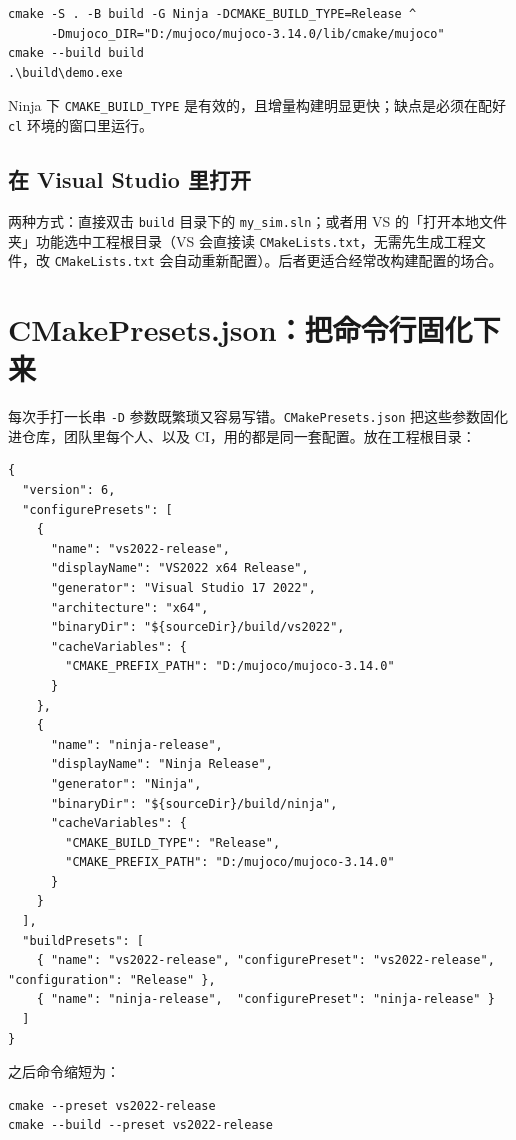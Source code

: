 \begin{lstlisting}[style=shell]
cmake -S . -B build -G Ninja -DCMAKE_BUILD_TYPE=Release ^
      -Dmujoco_DIR="D:/mujoco/mujoco-3.14.0/lib/cmake/mujoco"
cmake --build build
.\build\demo.exe
\end{lstlisting}

Ninja 下 \texttt{CMAKE\_BUILD\_TYPE} 是有效的，且增量构建明显更快；缺点是必须在配好 \texttt{cl} 环境的窗口里运行。

\subsection{在 Visual Studio 里打开}

两种方式：直接双击 \texttt{build} 目录下的 \texttt{my\_sim.sln}；或者用 VS 的「打开本地文件夹」功能选中工程根目录（VS 会直接读 \texttt{CMakeLists.txt}，无需先生成工程文件，改 \texttt{CMakeLists.txt} 会自动重新配置）。后者更适合经常改构建配置的场合。

\section{CMakePresets.json：把命令行固化下来}

每次手打一长串 \texttt{-D} 参数既繁琐又容易写错。\texttt{CMakePresets.json} 把这些参数固化进仓库，团队里每个人、以及 CI，用的都是同一套配置。放在工程根目录：

\begin{lstlisting}[style=code]
{
  "version": 6,
  "configurePresets": [
    {
      "name": "vs2022-release",
      "displayName": "VS2022 x64 Release",
      "generator": "Visual Studio 17 2022",
      "architecture": "x64",
      "binaryDir": "${sourceDir}/build/vs2022",
      "cacheVariables": {
        "CMAKE_PREFIX_PATH": "D:/mujoco/mujoco-3.14.0"
      }
    },
    {
      "name": "ninja-release",
      "displayName": "Ninja Release",
      "generator": "Ninja",
      "binaryDir": "${sourceDir}/build/ninja",
      "cacheVariables": {
        "CMAKE_BUILD_TYPE": "Release",
        "CMAKE_PREFIX_PATH": "D:/mujoco/mujoco-3.14.0"
      }
    }
  ],
  "buildPresets": [
    { "name": "vs2022-release", "configurePreset": "vs2022-release", "configuration": "Release" },
    { "name": "ninja-release",  "configurePreset": "ninja-release" }
  ]
}
\end{lstlisting}

之后命令缩短为：

\begin{lstlisting}[style=shell]
cmake --preset vs2022-release
cmake --build --preset vs2022-release
\end{lstlisting}

